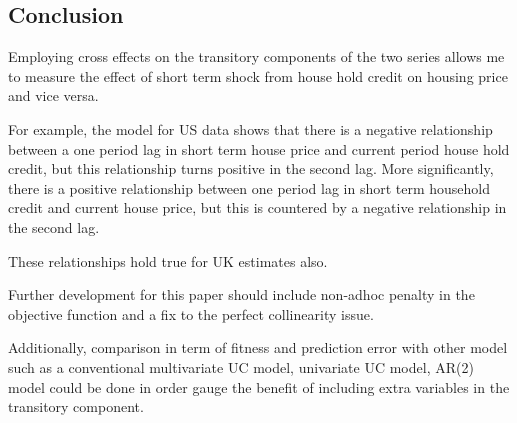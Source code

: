 \documentclass[fleqn]{article}
\begin{document}
\begin{outline}[enumerate]
\section{Conclusion}
Employing cross effects on the transitory components of the two series allows me to measure the effect of short term shock from house hold credit on housing price and vice versa.  

For example, the model for US data shows that there is a negative relationship between a one period lag in short term house price and current period house hold credit, but this relationship turns positive in the second lag. More significantly, there is a positive relationship between one period lag in short term household credit and current house price, but this is countered by a negative relationship in the second lag.

These relationships hold true for UK estimates also.

Further development for this paper should include non-adhoc penalty in the objective function and a fix to the perfect collinearity issue.

Additionally, comparison in term of fitness and prediction error with other model such as a conventional multivariate UC model, univariate UC model, AR(2) model could be done in order gauge the benefit of including extra variables in the transitory component.


\end{outline}
\end{document}

